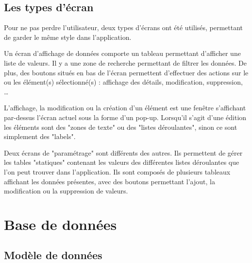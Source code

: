 \subsection{Les types d'écran}

Pour ne pas perdre l'utilisateur, deux types d'écrans ont été utilisés, permettant de garder le même style dans l'application.

Un écran d'affichage de données comporte un tableau permettant d'afficher une liste de valeurs.
Il y a une zone de recherche permettant de filtrer les données.
De plus, des boutons situés en bas de l'écran permettent d'effectuer des actions sur le ou les élément(s) sélectionné(s) : affichage des détails, modification, suppression, \ldots

L'affichage, la modification ou la création d'un élément est une fenêtre s'affichant par-dessus l'écran actuel sous la forme d'un pop-up.
Lorsqu'il s'agit d'une édition les éléments sont des "zones de texte" ou des "listes déroulantes", sinon ce sont simplement des "labels".

Deux écrans de "paramétrage" sont différents des autres.
Ils permettent de gérer les tables "statiques" contenant les valeurs des différentes listes déroulantes que l'on peut trouver dans l'application.
Ils sont composés de plusieurs tableaux affichant les données présentes, avec des boutons permettant l'ajout, la modification ou la suppression de valeurs.


\section{Base de données}


\subsection{Modèle de données}

